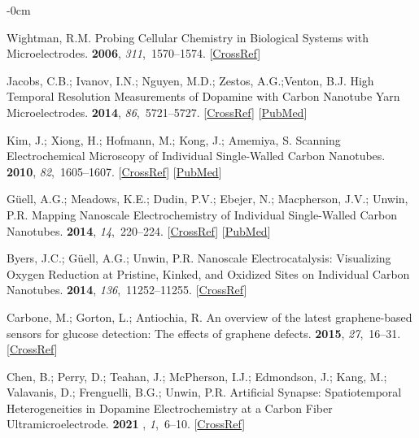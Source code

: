 \documentclass[molecules,article,accept,pdftex,moreauthors]{Definitions/mdpi}
\begin{document}
\begin{adjustwidth}{-\extralength}{0cm}
\begin{thebibliography}{999}
Wightman, R.M.
\newblock Probing Cellular Chemistry in Biological Systems with
Microelectrodes.
 {\bf 2006}, {\em 311},~1570--1574. [\href{http://dx.doi.org/10.1126/science.1120027}{CrossRef}]

Jacobs, C.B.; Ivanov, I.N.; Nguyen, M.D.; Zestos, A.G.;Venton, B.J.
\newblock High Temporal Resolution Measurements of Dopamine with Carbon Nanotube Yarn Microelectrodes.
 {\bf 2014}, {\em 86},~5721--5727. [\href{http://dx.doi.org/10.1021/ac404050t}{CrossRef}] [\href{http://www.ncbi.nlm.nih.gov/pubmed/24832571}{PubMed}]

Kim, J.; Xiong, H.; Hofmann, M.; Kong, J.; Amemiya, S.
\newblock Scanning Electrochemical Microscopy of Individual Single-Walled
Carbon Nanotubes.
 {\bf 2010}, {\em 82},~1605--1607. [\href{http://dx.doi.org/10.1021/ac9028032}{CrossRef}] [\href{http://www.ncbi.nlm.nih.gov/pubmed/20112959}{PubMed}]

G{\"u}ell, A.G.; Meadows, K.E.; Dudin, P.V.; Ebejer, N.; Macpherson, J.V.;
Unwin, P.R.
\newblock Mapping Nanoscale Electrochemistry of Individual Single-Walled Carbon
Nanotubes.
 {\bf 2014}, {\em 14},~220--224. [\href{http://dx.doi.org/10.1021/nl403752e}{CrossRef}] [\href{http://www.ncbi.nlm.nih.gov/pubmed/24274402}{PubMed}]

Byers, J.C.; G{\"u}ell, A.G.; Unwin, P.R.
\newblock Nanoscale Electrocatalysis: Visualizing Oxygen Reduction at Pristine,
Kinked, and Oxidized Sites on Individual Carbon Nanotubes.
 {\bf 2014}, {\em 136},~11252--11255. [\href{http://dx.doi.org/10.1021/ja505708y}{CrossRef}]

Carbone, M.; Gorton, L.; Antiochia, R.
\newblock An overview of the latest graphene-based sensors for glucose
detection: The effects of graphene defects.
 {\bf 2015}, {\em 27},~16--31. [\href{http://dx.doi.org/10.1002/elan.201400409}{CrossRef}]

Chen, B.; Perry, D.; Teahan, J.; McPherson, I.J.; Edmondson, J.; Kang, M.;
Valavanis, D.; Frenguelli, B.G.; Unwin, P.R.
\newblock Artificial Synapse: Spatiotemporal Heterogeneities in Dopamine
Electrochemistry at a Carbon Fiber Ultramicroelectrode.
 {\bf 2021}
, {\em 1},~6--10. [\href{http://dx.doi.org/10.1021/acsmeasuresciau.1c00006}{CrossRef}]


\end{thebibliography}
\end{adjustwidth}
\end{document}
